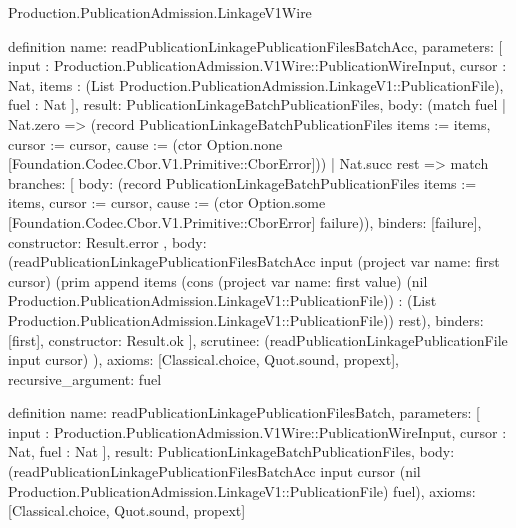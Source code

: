 \begin{lexlean}{Production.PublicationAdmission.LinkageV1Wire}
\begin{semanticmodule}
definition{
  name: readPublicationLinkagePublicationFilesBatchAcc,
  parameters: [
    input : Production.PublicationAdmission.V1Wire::PublicationWireInput,
    cursor : Nat,
    items : (List Production.PublicationAdmission.LinkageV1::PublicationFile),
    fuel : Nat
  ],
  result: PublicationLinkageBatchPublicationFiles,
  body: (match fuel
    | Nat.zero => (record PublicationLinkageBatchPublicationFiles {items := items, cursor := cursor, cause := (ctor Option.none [Foundation.Codec.Cbor.V1.Primitive::CborError])})
    | Nat.succ rest => match{
      branches: [
        {
          body: (record PublicationLinkageBatchPublicationFiles {items := items, cursor := cursor, cause := (ctor Option.some [Foundation.Codec.Cbor.V1.Primitive::CborError] failure)}),
          binders: [failure],
          constructor: Result.error
        },
        {
          body: (readPublicationLinkagePublicationFilesBatchAcc input (project var{
            name: first
          } cursor) (prim append items (cons (project var{
            name: first
          } value) (nil Production.PublicationAdmission.LinkageV1::PublicationFile)) : (List Production.PublicationAdmission.LinkageV1::PublicationFile)) rest),
          binders: [first],
          constructor: Result.ok
        }
      ],
      scrutinee: (readPublicationLinkagePublicationFile input cursor)
    }),
  axioms: [Classical.choice, Quot.sound, propext],
  recursive_argument: fuel
}

definition{
  name: readPublicationLinkagePublicationFilesBatch,
  parameters: [
    input : Production.PublicationAdmission.V1Wire::PublicationWireInput,
    cursor : Nat,
    fuel : Nat
  ],
  result: PublicationLinkageBatchPublicationFiles,
  body: (readPublicationLinkagePublicationFilesBatchAcc input cursor (nil Production.PublicationAdmission.LinkageV1::PublicationFile) fuel),
  axioms: [Classical.choice, Quot.sound, propext]
}


\end{semanticmodule}
\end{lexlean}
